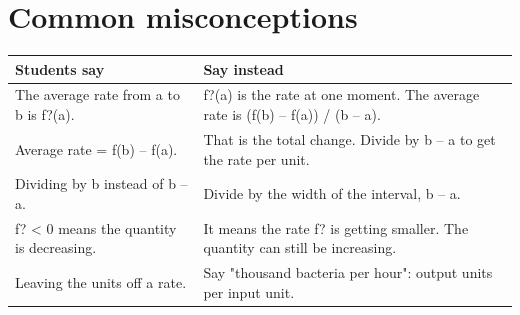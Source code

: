 \documentclass[11pt]{article}
\begin{document}
\section*{Common misconceptions}\begin{tabularx}{\textwidth}{@{}X X@{}}\toprule Students say & Say instead\\\midrule
The average rate from a to b is f?(a). & f?(a) is the rate at one moment. The average rate is (f(b) -- f(a)) / (b -- a).\\
Average rate = f(b) -- f(a). & That is the total change. Divide by b -- a to get the rate per unit.\\
Dividing by b instead of b -- a. & Divide by the width of the interval, b -- a.\\
f? < 0 means the quantity is decreasing. & It means the rate f? is getting smaller. The quantity can still be increasing.\\
Leaving the units off a rate. & Say "thousand bacteria per hour": output units per input unit.\\
\bottomrule\end{tabularx}
\end{document}
